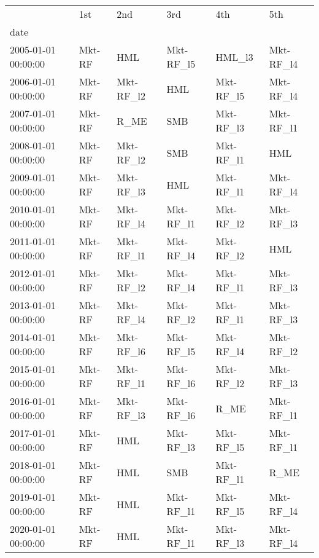 \begin{tabular}{llllll}
\toprule
 & 1st & 2nd & 3rd & 4th & 5th \\
date &  &  &  &  &  \\
\midrule
2005-01-01 00:00:00 & Mkt-RF & HML & Mkt-RF_l5 & HML_l3 & Mkt-RF_l4 \\
2006-01-01 00:00:00 & Mkt-RF & Mkt-RF_l2 & HML & Mkt-RF_l5 & Mkt-RF_l4 \\
2007-01-01 00:00:00 & Mkt-RF & R_ME & SMB & Mkt-RF_l3 & Mkt-RF_l1 \\
2008-01-01 00:00:00 & Mkt-RF & Mkt-RF_l2 & SMB & Mkt-RF_l1 & HML \\
2009-01-01 00:00:00 & Mkt-RF & Mkt-RF_l3 & HML & Mkt-RF_l1 & Mkt-RF_l4 \\
2010-01-01 00:00:00 & Mkt-RF & Mkt-RF_l4 & Mkt-RF_l1 & Mkt-RF_l2 & Mkt-RF_l3 \\
2011-01-01 00:00:00 & Mkt-RF & Mkt-RF_l1 & Mkt-RF_l4 & Mkt-RF_l2 & HML \\
2012-01-01 00:00:00 & Mkt-RF & Mkt-RF_l2 & Mkt-RF_l4 & Mkt-RF_l1 & Mkt-RF_l3 \\
2013-01-01 00:00:00 & Mkt-RF & Mkt-RF_l4 & Mkt-RF_l2 & Mkt-RF_l1 & Mkt-RF_l3 \\
2014-01-01 00:00:00 & Mkt-RF & Mkt-RF_l6 & Mkt-RF_l5 & Mkt-RF_l4 & Mkt-RF_l2 \\
2015-01-01 00:00:00 & Mkt-RF & Mkt-RF_l1 & Mkt-RF_l6 & Mkt-RF_l2 & Mkt-RF_l3 \\
2016-01-01 00:00:00 & Mkt-RF & Mkt-RF_l3 & Mkt-RF_l6 & R_ME & Mkt-RF_l1 \\
2017-01-01 00:00:00 & Mkt-RF & HML & Mkt-RF_l3 & Mkt-RF_l5 & Mkt-RF_l1 \\
2018-01-01 00:00:00 & Mkt-RF & HML & SMB & Mkt-RF_l1 & R_ME \\
2019-01-01 00:00:00 & Mkt-RF & HML & Mkt-RF_l1 & Mkt-RF_l5 & Mkt-RF_l4 \\
2020-01-01 00:00:00 & Mkt-RF & HML & Mkt-RF_l1 & Mkt-RF_l3 & Mkt-RF_l4 \\
\bottomrule
\end{tabular}

